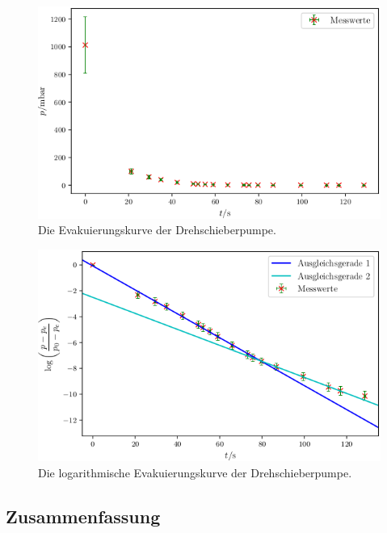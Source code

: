 \begin{figure}
\centering
\includegraphics[width=\linewidth-70pt,height=\textheight-70pt,keepaspectratio]{content/images/DSE.png}
\caption{Die Evakuierungskurve der Drehschieberpumpe.}
\label{fig:DSE}
\end{figure}

\begin{figure}
\centering
\includegraphics[width=\linewidth-70pt,height=\textheight-70pt,keepaspectratio]{content/images/DSL.png}
\caption{Die logarithmische Evakuierungskurve der Drehschieberpumpe.}
\label{fig:DSL}
\end{figure}

\subsection{Zusammenfassung}

